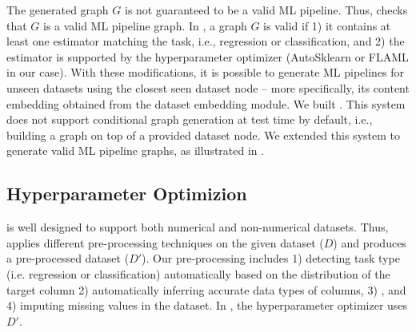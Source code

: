 

The generated graph  $G$ is not guaranteed to be a valid ML pipeline. Thus,  checks that $G$ is a valid ML pipeline graph. In {\sysname}, a graph $G$ is valid if 1) it contains at least one estimator matching the task, i.e., regression or classification, and 2) the estimator is supported by the hyperparameter optimizer (AutoSklearn or FLAML in our case). With these modifications, it is possible to generate ML pipelines for unseen datasets using the closest seen dataset node -- more specifically, its content embedding obtained from the dataset embedding module. We  built . This system does not support conditional graph generation at test time by default, i.e., building a graph on top of a provided dataset node. We extended this system to generate valid ML pipeline graphs, as illustrated in .  




\subsection{Hyperparameter Optimizion}

{\sysname} is well designed to support both  numerical and non-numerical datasets.  Thus, {\sysname}  applies different pre-processing techniques on the given dataset ($D$) and produces a pre-processed dataset ($D'$).
Our pre-processing includes 1) detecting task type (i.e. regression or classification) automatically based on the distribution of the target column 2) automatically inferring accurate data types of columns, 3) , and 4) imputing missing values in the dataset. In {\sysname}, the hyperparameter optimizer uses $D'$.



